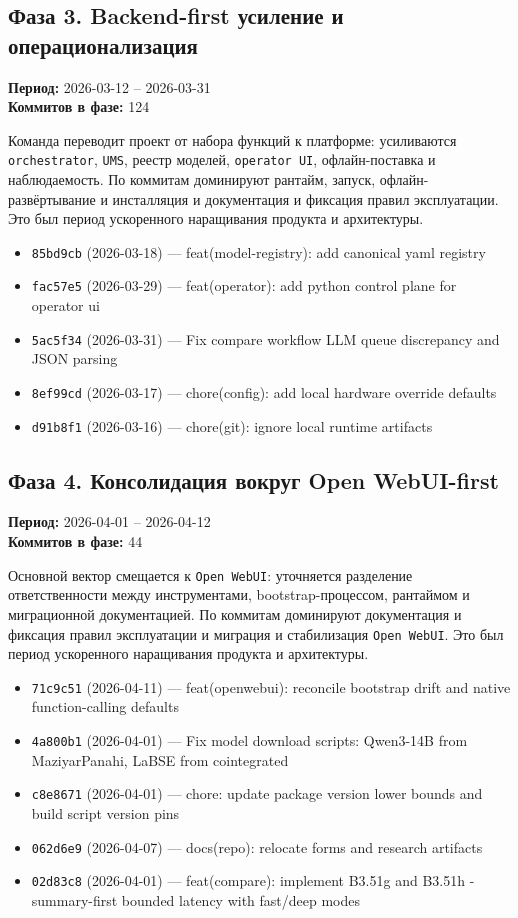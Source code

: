 \subsection*{Фаза 3. Backend-first усиление и операционализация}
\textbf{Период:} 2026-03-12 -- 2026-03-31 \\
\textbf{Коммитов в фазе:} 124

Команда переводит проект от набора функций к платформе: усиливаются \texttt{orchestrator}, \texttt{UMS}, реестр моделей, \texttt{operator UI}, офлайн-поставка и наблюдаемость. По коммитам доминируют рантайм, запуск, офлайн-развёртывание и инсталляция и документация и фиксация правил эксплуатации. Это был период ускоренного наращивания продукта и архитектуры.

\begin{itemize}
\item \texttt{85bd9cb} (2026-03-18) --- feat(model-registry): add canonical yaml registry
\item \texttt{fac57e5} (2026-03-29) --- feat(operator): add python control plane for operator ui
\item \texttt{5ac5f34} (2026-03-31) --- Fix compare workflow LLM queue discrepancy and JSON parsing
\item \texttt{8ef99cd} (2026-03-17) --- chore(config): add local hardware override defaults
\item \texttt{d91b8f1} (2026-03-16) --- chore(git): ignore local runtime artifacts
\end{itemize}

\subsection*{Фаза 4. Консолидация вокруг Open WebUI-first}
\textbf{Период:} 2026-04-01 -- 2026-04-12 \\
\textbf{Коммитов в фазе:} 44

Основной вектор смещается к \texttt{Open WebUI}: уточняется разделение ответственности между инструментами, bootstrap-процессом, рантаймом и миграционной документацией. По коммитам доминируют документация и фиксация правил эксплуатации и миграция и стабилизация \texttt{Open WebUI}. Это был период ускоренного наращивания продукта и архитектуры.

\begin{itemize}
\item \texttt{71c9c51} (2026-04-11) --- feat(openwebui): reconcile bootstrap drift and native function-calling defaults
\item \texttt{4a800b1} (2026-04-01) --- Fix model download scripts: Qwen3-14B from MaziyarPanahi, LaBSE from cointegrated
\item \texttt{c8e8671} (2026-04-01) --- chore: update package version lower bounds and build script version pins
\item \texttt{062d6e9} (2026-04-07) --- docs(repo): relocate forms and research artifacts
\item \texttt{02d83c8} (2026-04-01) --- feat(compare): implement B3.51g and B3.51h - summary-first bounded latency with fast/deep modes
\end{itemize}
